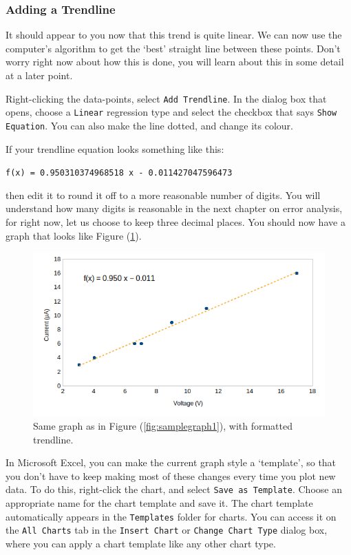 \subsubsection{Adding a Trendline}

It should appear to you now that this trend is quite linear. We can now use the computer's algorithm to get the `best' straight line between these points. Don't worry right now about how this is done, you will learn about this in some detail at a later point.

Right-clicking the data-points, select \texttt{Add Trendline}. In the dialog box that opens, choose a \texttt{Linear} regression type and select the checkbox that says \texttt{Show Equation}. You can also make the line dotted, and change its colour. 

If your trendline equation looks something like this:
\begin{center}
    \texttt{f(x) = 0.950310374968518 x - 0.011427047596473}
\end{center}

then edit it to round it off to a more reasonable number of digits. You will understand how many digits is reasonable in the next chapter on error analysis, for right now, let us choose to keep three decimal places. You should now have a graph that looks like Figure (\ref{fig:samplegraph3}).

\begin{figure}[!htb]
    \centering
    \includegraphics[scale=0.8]{figs/samplegraph3.png}
    \caption{Same graph as in Figure (\ref{fig:samplegraph1}), with formatted trendline.}
    \label{fig:samplegraph3}
\end{figure}

\begin{tip}
In Microsoft Excel, you can make the current graph style a `template', so that you don't have to keep making most of these changes every time you plot new data. To do this, right-click the chart, and select \texttt{Save as Template}. Choose an appropriate name for the chart template and save it. The chart template automatically appears in the \texttt{Templates} folder for charts. You can access it on the \texttt{All Charts} tab in the \texttt{Insert Chart} or \texttt{Change Chart Type} dialog box, where you can apply a chart template like any other chart type.
\end{tip}









